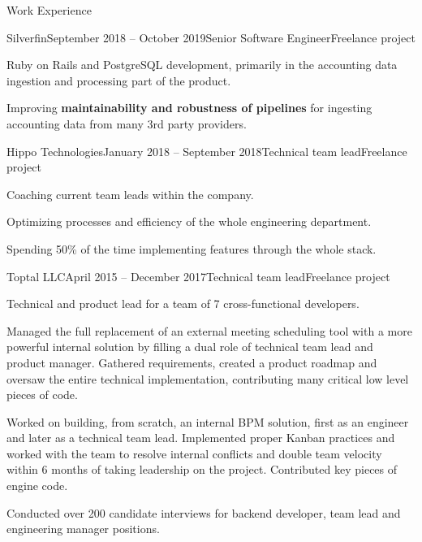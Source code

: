 \documentclass[
	11pt, %
]{resume} %
\begin{document}
\begin{rSection}{Work Experience}
	\begin{rSubsection}{Silverfin}{September 2018 -- October 2019}{Senior Software Engineer}{Freelance project}
		\item Ruby on Rails and PostgreSQL development, primarily in the accounting data ingestion and processing part of the product.
		\item Improving \textbf{maintainability and robustness of pipelines} for ingesting accounting data from many 3rd party providers.
	\end{rSubsection}

	\begin{rSubsection}{Hippo Technologies}{January 2018 -- September 2018}{Technical team lead}{Freelance project}
		\item Coaching current team leads within the company.
		\item Optimizing processes and efficiency of the whole engineering department.
		\item Spending 50\% of the time implementing features through the whole stack.
	\end{rSubsection}

	\begin{rSubsection}{Toptal LLC}{April 2015 -- December 2017}{Technical team lead}{Freelance project}
		\item Technical and product lead for a team of 7 cross-functional developers.
		\item Managed the full replacement of an external meeting scheduling tool with a more powerful internal solution by filling a dual role of technical team lead and product manager. Gathered requirements, created a product roadmap and oversaw the entire technical implementation, contributing many critical low level pieces of code.
		\item Worked on building, from scratch, an internal BPM solution, first as an engineer and later as a technical team lead. Implemented proper Kanban practices and worked with the team to resolve internal conflicts and double team velocity within 6 months of taking leadership on the project. Contributed key pieces of engine code.
		\item Conducted over 200 candidate interviews for backend developer, team lead and engineering manager positions.
	\end{rSubsection}


\end{rSection}
\end{document}
